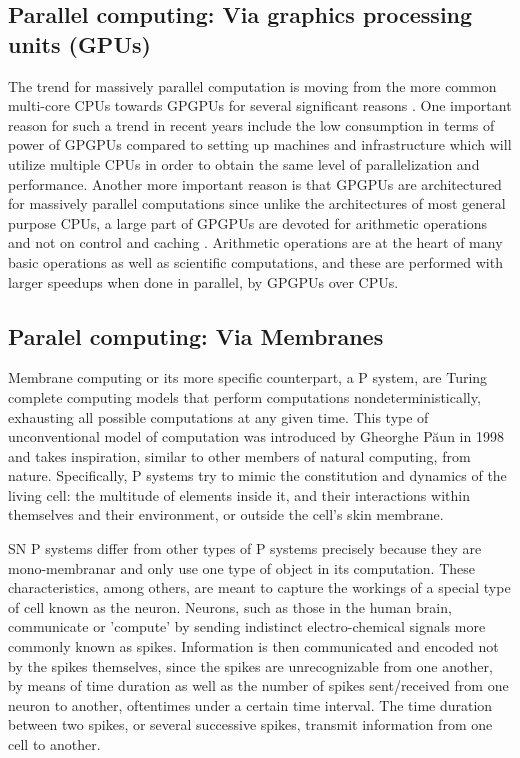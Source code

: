 \documentclass{acm_proc_article-sp}
\begin{document}
\subsection{Parallel computing: Via graphics processing units (GPUs)}
The trend for massively parallel computation is moving from the more common multi-core CPUs towards GPGPUs for several significant reasons \cite{cudabook}\cite{cudaguide}. One important reason for such a trend in recent years include the low consumption in terms of power of GPGPUs compared to setting up machines and infrastructure which will utilize multiple CPUs in order to obtain the same level of parallelization and performance\cite{cudapage}. Another more important reason is that GPGPUs are architectured for massively parallel computations since unlike the architectures of most general purpose CPUs, a large part of GPGPUs are devoted for arithmetic operations and not on control and caching \cite{cudabook}\cite{cudaguide}. Arithmetic operations are at the heart of many basic operations as well as scientific computations, and these are performed with  larger speedups when done in parallel, by GPGPUs over CPUs. 

\subsection{Paralel computing: Via Membranes}
Membrane computing or its more specific counterpart, a P system, are Turing complete computing models that perform computations nondeterministically, exhausting all possible  computations at any given time. This type of unconventional model of computation was introduced by Gheorghe P\u aun in 1998 and takes inspiration, similar to other members of natural computing, from nature\cite{introtomem}\cite{ppage}. Specifically, P systems try to mimic the constitution and dynamics of the living cell: the multitude of elements inside it, and their interactions within themselves and their environment, or outside the cell's skin membrane.

SN P systems differ from other types of P systems precisely because they are mono-membranar and only use one type of object in its computation. These characteristics, among others, are meant to capture the workings of a special type of cell known as the neuron. Neurons, such as those in the human brain, communicate or 'compute' by sending indistinct electro-chemical  signals more commonly known as spikes. Information is then communicated and encoded not by the spikes themselves, since the spikes are unrecognizable from one another, by means of time duration as well as the number of spikes sent/received from one neuron to another, oftentimes under a certain time interval\cite{snp}. The time duration between two spikes, or several successive spikes, transmit information from one cell to another.  
\end{document}
